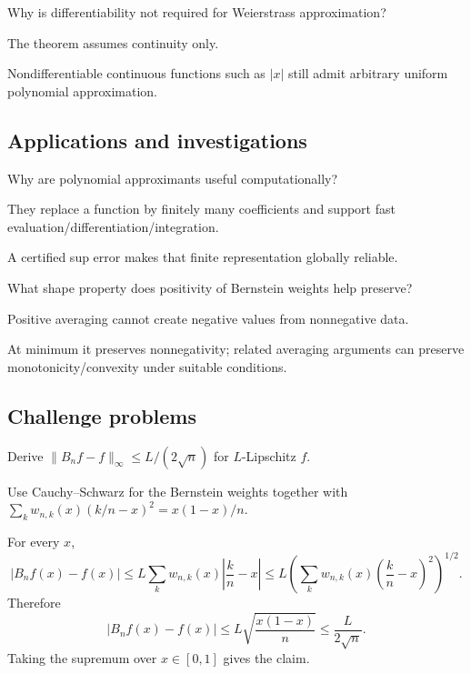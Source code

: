 \begin{exercise}\label{exr:ii21-expand-12}
Why is differentiability not required for Weierstrass approximation?
\end{exercise}
\begin{hint}
The theorem assumes continuity only.
\end{hint}
\begin{solution}
Nondifferentiable continuous functions such as \(|x|\) still admit arbitrary uniform polynomial approximation.
\end{solution}

\subsection*{Applications and investigations}

\begin{exercise}\label{exr:ii21-expand-13}
Why are polynomial approximants useful computationally?
\end{exercise}
\begin{hint}
They replace a function by finitely many coefficients and support fast evaluation/differentiation/integration.
\end{hint}
\begin{solution}
A certified sup error makes that finite representation globally reliable.
\end{solution}

\begin{exercise}\label{exr:ii21-expand-14}
What shape property does positivity of Bernstein weights help preserve?
\end{exercise}
\begin{hint}
Positive averaging cannot create negative values from nonnegative data.
\end{hint}
\begin{solution}
At minimum it preserves nonnegativity; related averaging arguments can preserve monotonicity/convexity under suitable conditions.
\end{solution}

\subsection*{Challenge problems}

\begin{exercise}\label{exr:ii21-expand-15}
Derive \(\|B_nf-f\|_\infty\le L/(2\sqrt n)\) for \(L\)-Lipschitz \(f\).
\end{exercise}
\begin{hint}
Use Cauchy--Schwarz for the Bernstein weights together with
\(\sum_k w_{n,k}(x)(k/n-x)^2=x(1-x)/n\).
\end{hint}
\begin{solution}
For every \(x\),
\[
|B_nf(x)-f(x)|
\le L\sum_k w_{n,k}(x)\left|\frac{k}{n}-x\right|
\le
L\left(
\sum_k w_{n,k}(x)\left(\frac{k}{n}-x\right)^2
\right)^{1/2}.
\]
Therefore
\[
|B_nf(x)-f(x)|
\le L\sqrt{\frac{x(1-x)}{n}}
\le \frac{L}{2\sqrt n}.
\]
Taking the supremum over \(x\in[0,1]\) gives the claim.
\end{solution}

